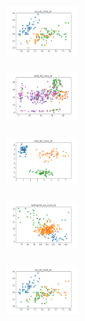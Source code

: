 \vspace*{\fill}
\newpage
\vspace*{\fill}

\begin{figure}[H]    
    \centering
    \begin{subfigure}
        \centering
        \includegraphics[width=0.234\textwidth]{img/copkm/iris_set_const_20_949004259_clust.png}
    \end{subfigure}
    \hfill
    \begin{subfigure}
        \centering
        \includegraphics[width=0.234\textwidth]{img/copkm/ecoli_set_const_20_949004259_clust.png}
    \end{subfigure}
    \hfill
    \begin{subfigure}
        \centering
        \includegraphics[width=0.234\textwidth]{img/copkm/rand_set_const_20_949004259_clust.png}
    \end{subfigure}
    \hfill
    \begin{subfigure}
        \centering
        \includegraphics[width=0.234\textwidth]{img/copkm/newthyroid_set_const_20_949004259_clust.png}
    \end{subfigure}
    \hfill
    \begin{subfigure}
        \centering
        \includegraphics[width=0.234\textwidth]{img/copkm/iris_set_const_20_589741062_clust.png}

\end{subfigure}
\end{figure}
